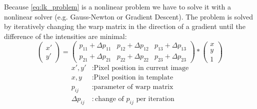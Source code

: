 \documentclass[11pt,a4paper,titlepage,oneside]{report}
\begin{document}
Because \ref{eq:lk_problem} is a nonlinear problem we have to solve it with a nonlinear solver (e.g. Gauss-Newton or Gradient Descent). The problem is solved by iteratively changing the warp matrix in the direction of a gradient until the difference of the intensities are minimal:
\begin{equation}
	\begin{pmatrix}
		x' \\
		y'
	\end{pmatrix}=
	\begin{pmatrix}
		p_{11}+\Delta p_{11} & p_{12}+\Delta p_{12} & p_{13}+\Delta p_{13} \\
		p_{21}+\Delta p_{21} & p_{22}+\Delta p_{22} & p_{23}+\Delta p_{23}
	\end{pmatrix}*
	\begin{pmatrix}
		x\\
		y\\
		1
	\end{pmatrix}
\end{equation}
\begin{align*}
	x',y'					&:	\text{Pixel position in current image}\\
	x,y						&:	\text{Pixel position in template}\\
	p_{ij}				&:	\text{parameter of warp matrix}\\
	\Delta p_{ij}	&:	\text{change of $p_{ij}$ per iteration}
\end{align*}
\end{document}

